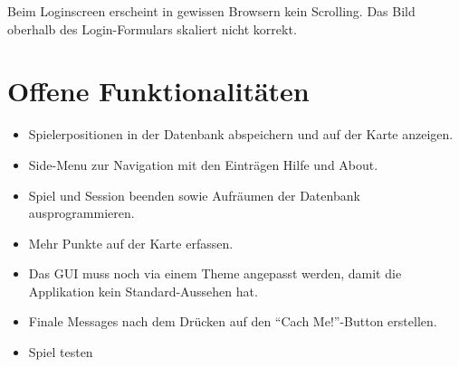 \documentclass[11pt]{article}
\begin{document}
Beim Loginscreen erscheint in gewissen Browsern kein Scrolling. Das Bild oberhalb des Login-Formulars skaliert nicht korrekt. 

\section{Offene Funktionalitäten}
\begin{itemize}
\item Spielerpositionen in der Datenbank abspeichern und auf der Karte anzeigen.
\item Side-Menu zur Navigation mit den Einträgen Hilfe und About.
\item Spiel und Session beenden sowie Aufräumen der Datenbank ausprogrammieren.
\item Mehr Punkte auf der Karte erfassen.
\item Das GUI muss noch via einem Theme angepasst werden, damit die Applikation kein Standard-Aussehen hat.
\item Finale Messages nach dem Drücken auf den ``Cach Me!''-Button erstellen.
\item Spiel testen
\end{itemize}
 
\end{document}
